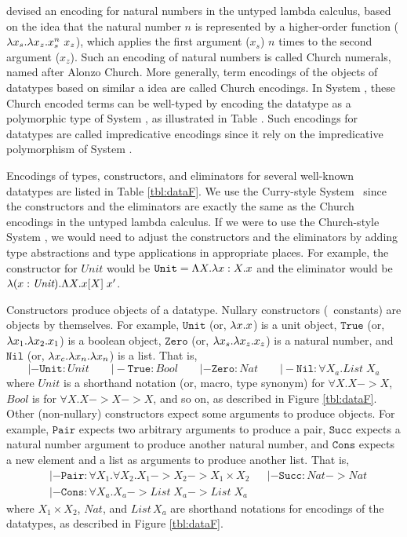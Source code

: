 \citet{Church41} devised an encoding for natural numbers
in the untyped lambda calculus, based on the idea that the natural number $n$
is represented by a higher-order function ($\lambda x_s.\lambda x_z.x_s^n~x_z$), which
applies the first argument ($x_s$) $n$ times to the second argument ($x_z$).
Such an encoding of natural numbers is called Church numerals, named after
Alonzo Church. More generally, term encodings of the objects of datatypes
based on similar a idea are called Church encodings. In System \F,
these Church encoded terms can be well-typed by encoding the datatype
as a polymorphic type of System \F, as illustrated in Table \label{tbl:dataF}.
Such encodings for datatypes are called impredicative encodings
since it rely on the impredicative polymorphism of System \F.

Encodings of types, constructors, and eliminators for
several well-known datatypes are listed in Table \ref{tbl:dataF}.
We use the Curry-style System \F\ since the constructors and the eliminators
are exactly the same as the Church encodings in the untyped lambda calculus.
If we were to use the Church-style System \F, we would need to adjust
the constructors and the eliminators by adding type abstractions and
type applications in appropriate places. For example,
the constructor for $\textit{Unit}$ would be
$\mathtt{Unit} = \Lambda X.\lambda x:X.x$ and the eliminator would be
$\lambda(x:\textit{Unit}).\Lambda X.x[X]\;x'$.

Constructors produce objects of a datatype. Nullary constructors
(\aka\ constants) are objects by themselves. For example,
$\mathtt{Unit}$ (or, $\lambda x.x$) is a unit object,
$\mathtt{True}$ (or, $\lambda x_1.\lambda x_2. x_1$) is a boolean object,
$\mathtt{Zero}$ (or, $\lambda x_s. \lambda x_z. x_z$) is a natural number, and
$\mathtt{Nil}$ (or, $\lambda x_c.\lambda x_n.\lambda x_n$) is a list.
That is,
\[
|- \mathtt{Unit}:\textit{Unit} \qquad
|- \mathtt{True}:\textit{Bool} \qquad
|- \mathtt{Zero}:\textit{Nat} \qquad
|- \mathtt{Nil}:\forall X_a.\textit{List}\;X_a
\]
where $\textit{Unit}$ is a shorthand notation (or, macro, type synonym)
for $\forall X.X -> X$, $Bool$ is for $\forall X.X -> X -> X$, and so on,
as described in Figure \ref{tbl:dataF}.
Other (non-nullary) constructors expect some arguments to produce objects.
For example, $\mathtt{Pair}$ expects two arbitrary arguments to produce a pair,
$\mathtt{Succ}$ expects a natural number argument to produce another
natural number, and $\mathtt{Cons}$ expects a new element and a list as
arguments to produce another list. That is,
\begin{align*}
& |- \mathtt{Pair} : \forall X_1. \forall X_2. X_1 -> X_2 -> X_1\times X_2
&& |- \mathtt{Succ} : \textit{Nat} -> \textit{Nat} \\ &
|- \mathtt{Cons} : \forall X_a. X_a -> \mathit{List}\;X_a -> \mathit{List}\;X_a
\end{align*}
where ${X_1 \times X_2}$, $\mathit{Nat}$, and $\mathit{List\,X_a}$
are shorthand notations for encodings of the datatypes,
as described in Figure \ref{tbl:dataF}.

